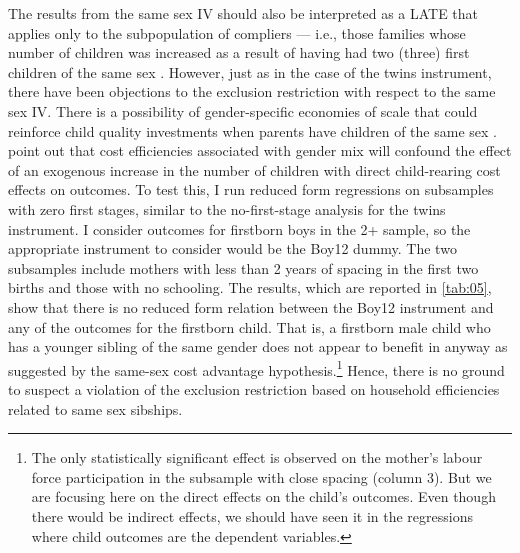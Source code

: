 The results from the same sex IV should also be interpreted as a LATE that applies only to the subpopulation of compliers --- i.e., those families whose number of children was increased as a result of having had two (three) first children of the same sex \parencite{bisbee_local_2015,oberg_casual_2021}. However, just as in the case of the twins instrument, there have been objections to the exclusion restriction with respect to the same sex IV. There is a possibility of gender-specific economies of scale that could reinforce child quality investments when parents have children of the same sex \parencite{clarke_children_2018}. \textcite{rosenzweig_natural_2000} point out that cost efficiencies associated with gender mix will confound the effect of an exogenous increase in the number of children with direct child-rearing cost effects on outcomes. To test this, I run reduced form regressions on subsamples with zero first stages, similar to the no-first-stage analysis for the twins instrument. I consider outcomes for firstborn boys in the 2+ sample, so the appropriate instrument to consider would be the Boy12 dummy. The two subsamples include mothers with less than 2 years of spacing in the first two births and those with no schooling. The results, which are reported in \autoref{tab:05}, show that there is no reduced form relation between the Boy12 instrument and any of the outcomes for the firstborn child. That is, a firstborn male child who has a younger sibling of the same gender does not appear to benefit in anyway as suggested by the same-sex cost advantage hypothesis.\footnote{The only statistically significant effect is observed on the mother's labour force participation in the subsample with close spacing (column 3). But we are focusing here on the direct effects on the child's outcomes. Even though there would be indirect effects, we should have seen it in the regressions where child outcomes are the dependent variables.} Hence, there is no ground to suspect a violation of the exclusion restriction based on household efficiencies related to same sex sibships. 








